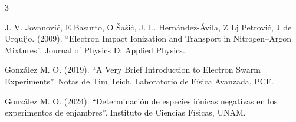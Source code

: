 \begin{thebibliography}{3}
	

	J. V. Jovanović, E Basurto, O Šašić, J. L. Hernández-Ávila, Z Lj Petrović, J de Urquijo. (2009). “Electron Impact Ionization
	and Transport in Nitrogen–Argon Mixtures”. Journal of Physics D: Applied Physics.
	
	González M. O. (2019). “A Very Brief Introduction
	to Electron Swarm Experiments”. Notas
	de Tim Teich, Laboratorio de Física Avanzada,
	PCF.
	
	González M. O. (2024). “Determinación de especies iónicas negativas en los experimentos de enjambres”. Instituto de Ciencias Físicas, UNAM. 
	
\end{thebibliography}